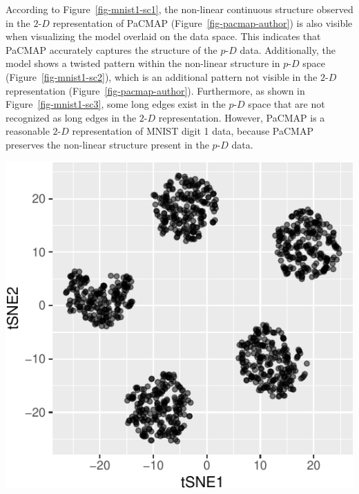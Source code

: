 \documentclass[
  12pt]{article}
\newcommand\pD{$p\text{-}D$}
\newcommand\gD{$2\text{-}D$}
\begin{document}
According to Figure~\ref{fig-mnist1-sc1}, the non-linear continuous
structure observed in the \gD{} representation of PaCMAP
(Figure~\ref{fig-pacmap-author}) is also visible when visualizing the
model overlaid on the data space. This indicates that PaCMAP accurately
captures the structure of the \pD{} data. Additionally, the model shows
a twisted pattern within the non-linear structure in \pD{} space
(Figure~\ref{fig-mnist1-sc2}), which is an additional pattern not
visible in the \gD{} representation (Figure~\ref{fig-pacmap-author}).
Furthermore, as shown in Figure~\ref{fig-mnist1-sc3}, some long edges
exist in the \pD{} space that are not recognized as long edges in the
\gD{} representation. However, PaCMAP is a reasonable \gD{}
representation of MNIST digit 1 data, because PaCMAP preserves the
non-linear structure present in the \pD{} data.

\begin{center}
\includegraphics[width=1\textwidth,height=\textheight]{paper_files/figure-pdf/unnamed-chunk-61-1.pdf}
\end{center}
\end{document}
